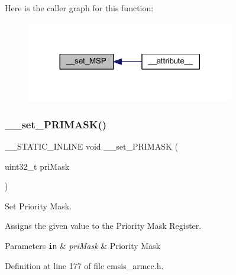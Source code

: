 Here is the caller graph for this function\+:
\nopagebreak
\begin{figure}[H]
\begin{center}
\leavevmode
\includegraphics[width=257pt]{group___c_m_s_i_s___core___reg_acc_functions_ga1ff33c0b5ed0e687dd7967a1dd283d5f_icgraph}
\end{center}
\end{figure}
\mbox{\label{group___c_m_s_i_s___core___reg_acc_functions_ga42e74e3fffe1a2d93db1de04d9260929}} 
\subsubsection{\texorpdfstring{\+\_\+\+\_\+set\+\_\+\+P\+R\+I\+M\+A\+S\+K()}{\_\_set\_PRIMASK()}}
{\footnotesize\ttfamily \+\_\+\+\_\+\+S\+T\+A\+T\+I\+C\+\_\+\+I\+N\+L\+I\+NE void \+\_\+\+\_\+set\+\_\+\+P\+R\+I\+M\+A\+SK (\begin{DoxyParamCaption}\item[{uint32\+\_\+t}]{pri\+Mask }\end{DoxyParamCaption})}



Set Priority Mask. 

Assigns the given value to the Priority Mask Register. 
\begin{DoxyParams}[1]{Parameters}
\mbox{\tt in}  & {\em pri\+Mask} & Priority Mask \\
\hline
\end{DoxyParams}


Definition at line 177 of file cmsis\+\_\+armcc.\+h.

